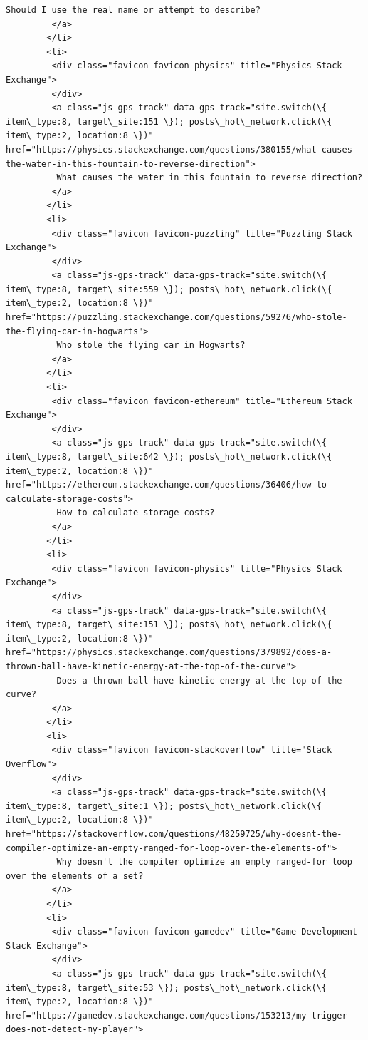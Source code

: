 \documentclass[11pt]{article}
\begin{document}
\begin{Verbatim}[commandchars=\\\{\}]
          Should I use the real name or attempt to describe?
         </a>
        </li>
        <li>
         <div class="favicon favicon-physics" title="Physics Stack Exchange">
         </div>
         <a class="js-gps-track" data-gps-track="site.switch(\{ item\_type:8, target\_site:151 \}); posts\_hot\_network.click(\{ item\_type:2, location:8 \})" href="https://physics.stackexchange.com/questions/380155/what-causes-the-water-in-this-fountain-to-reverse-direction">
          What causes the water in this fountain to reverse direction?
         </a>
        </li>
        <li>
         <div class="favicon favicon-puzzling" title="Puzzling Stack Exchange">
         </div>
         <a class="js-gps-track" data-gps-track="site.switch(\{ item\_type:8, target\_site:559 \}); posts\_hot\_network.click(\{ item\_type:2, location:8 \})" href="https://puzzling.stackexchange.com/questions/59276/who-stole-the-flying-car-in-hogwarts">
          Who stole the flying car in Hogwarts?
         </a>
        </li>
        <li>
         <div class="favicon favicon-ethereum" title="Ethereum Stack Exchange">
         </div>
         <a class="js-gps-track" data-gps-track="site.switch(\{ item\_type:8, target\_site:642 \}); posts\_hot\_network.click(\{ item\_type:2, location:8 \})" href="https://ethereum.stackexchange.com/questions/36406/how-to-calculate-storage-costs">
          How to calculate storage costs?
         </a>
        </li>
        <li>
         <div class="favicon favicon-physics" title="Physics Stack Exchange">
         </div>
         <a class="js-gps-track" data-gps-track="site.switch(\{ item\_type:8, target\_site:151 \}); posts\_hot\_network.click(\{ item\_type:2, location:8 \})" href="https://physics.stackexchange.com/questions/379892/does-a-thrown-ball-have-kinetic-energy-at-the-top-of-the-curve">
          Does a thrown ball have kinetic energy at the top of the curve?
         </a>
        </li>
        <li>
         <div class="favicon favicon-stackoverflow" title="Stack Overflow">
         </div>
         <a class="js-gps-track" data-gps-track="site.switch(\{ item\_type:8, target\_site:1 \}); posts\_hot\_network.click(\{ item\_type:2, location:8 \})" href="https://stackoverflow.com/questions/48259725/why-doesnt-the-compiler-optimize-an-empty-ranged-for-loop-over-the-elements-of">
          Why doesn't the compiler optimize an empty ranged-for loop over the elements of a set?
         </a>
        </li>
        <li>
         <div class="favicon favicon-gamedev" title="Game Development Stack Exchange">
         </div>
         <a class="js-gps-track" data-gps-track="site.switch(\{ item\_type:8, target\_site:53 \}); posts\_hot\_network.click(\{ item\_type:2, location:8 \})" href="https://gamedev.stackexchange.com/questions/153213/my-trigger-does-not-detect-my-player">

\end{Verbatim}
\end{document}
